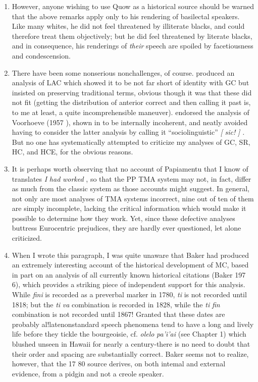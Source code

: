 \begin{enumerate}
\item However, anyone wishing to use Quow as a historical source should be warned that the above remarks apply only to his rendering of basilectal speakers. Like many whites, he did not feel threatened by illiterate blacks, and could therefore treat them objectively; but he did feel threatened by literate blacks, and in consequence, his ren\-derings of \textit{their} speech are spoiled by facetiousness and condescension.
\item There have been some nonserious nonchallenges, of course. \citet{Christie1976} produced an analysis of LAC which showed it to be not far short of identity with GC but insisted on preserving traditional terms, obvious though it was that these did not fit (getting the distri\-bution of anterior correct and then calling it past is, to me at least, a quite incomprehensible maneuver). \citet{Seuren1980} endorsed the analysis of Voorhoeve (1957 ), shown in \citet{Bickerton1975} to be intern\-ally incoherent, and neatly avoided having to consider the latter analy\-sis by calling it ``sociolinguistic'' \textit{[} \textit{sic!} \textit{]} \textit{.} But no one has systematically attempted to criticize my analyses of GC, SR, HC, and HCE, for the obvious reasons.
\item It is perhaps worth observing that no account of Papiamentu that I know of translates \textit{I} \textit{had} \textit{worked} , so that the PP TMA system may not, in fact, differ as much from the classic system as those ac\-counts might suggest. In general, not only are most analyses of TMA systems incorrect, nine out of ten of them are simply incomplete, lacking the critical information which would make it possible to deter\-mine how they work. Yet, since these defective analyses buttress Euro\-centric prejudices, they are hardly ever questioned, let alone criticized.
\item When I wrote this paragraph, I was quite unaware that Baker had produced an extremely interesting account of the historical de\-velopment of MC, based in part on an analysis of all currently known historical citations (Baker 197 6), which provides a striking piece of independent support for this analysis. While \textit{fini} is recorded as a pre\-verbal marker in 1780, \textit{ti }is not recorded until 1818; but the \textit{ti} \textit{va}
combination is recorded in 1828, while the \textit{ti} \textit{fin} combination is not recorded until 1867! Granted that these dates are probably al!late\-nonstandard speech phenomena tend to have a long and lively life before they tickle the bourgeoisie, cf. \textit{olelo} \textit{pa'i'ai} (see Chapter 1) which blushed unseen in Hawaii for nearly a century-there is no need to doubt that their order and spacing are substantially correct. Baker seems not to realize, however, that the 17 80 source derives, on both intemal and external evidence, from a pidgin and not a creole speaker.

\end{enumerate}
